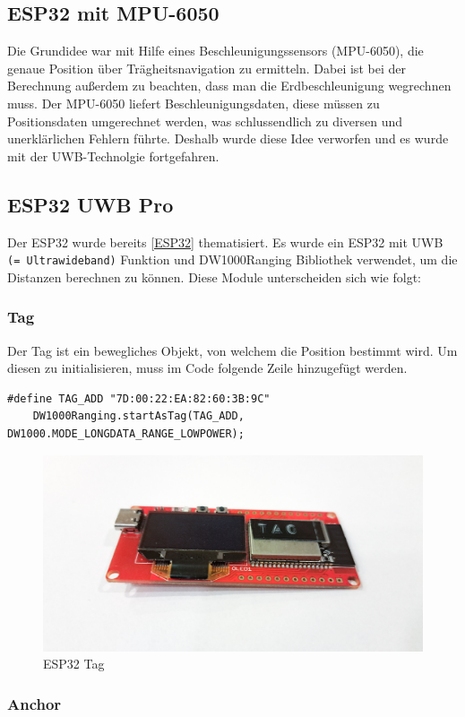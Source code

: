 \subsection{ESP32 mit MPU-6050}
Die Grundidee war mit Hilfe eines Beschleunigungssensors (MPU-6050), die genaue Position über Trägheitsnavigation zu ermitteln. Dabei ist bei der Berechnung außerdem zu beachten, dass man die Erdbeschleunigung wegrechnen muss. Der MPU-6050 liefert Beschleunigungsdaten, diese müssen zu Positionsdaten umgerechnet werden, was schlussendlich zu diversen und unerklärlichen Fehlern führte. Deshalb wurde diese Idee verworfen und es wurde mit der UWB-Technolgie fortgefahren. \parencite{MPU6050}

\subsection{ESP32 UWB Pro}

Der ESP32 wurde bereits \ref{ESP32} thematisiert. Es wurde ein ESP32 mit UWB \texttt{(= Ultrawideband)} Funktion und DW1000Ranging Bibliothek verwendet, um die Distanzen berechnen zu können. Diese Module unterscheiden sich wie folgt:

\subsubsection{Tag}
Der Tag ist ein bewegliches Objekt, von welchem die Position bestimmt wird. Um diesen zu initialisieren, muss im Code folgende Zeile hinzugefügt werden.
\begin{lstlisting}[style=C++, caption=Tag Initialisierung, captionpos=b]
	#define TAG_ADD "7D:00:22:EA:82:60:3B:9C"
	DW1000Ranging.startAsTag(TAG_ADD, DW1000.MODE_LONGDATA_RANGE_LOWPOWER);
\end{lstlisting}

\begin{figure}[H]
	\centering
	\includegraphics[width=0.5\linewidth]{images/Tag.jpg}
	\caption[ESP32 Tag]{ESP32 Tag}
	\label{fig:ESP32-Tag}
\end{figure}

\newpage
\subsubsection{Anchor}

